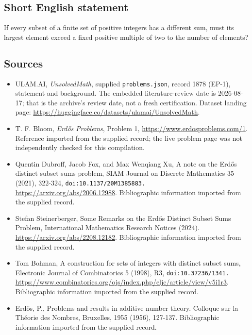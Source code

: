 \documentclass[11pt,a4paper]{article}
\begin{document}
\subsection{Short English statement}

If every subset of a finite set of positive integers has a different sum, must its largest element exceed a fixed positive multiple of two to the number of elements?

\subsection{Sources}

{\small

\begin{itemize}

\item[\hypertarget{source:1878:1}{S1}] ULAM.AI, \emph{UnsolvedMath}, supplied \texttt{problems.json}, record 1878 (EP-1), statement and background. The embedded literature-review date is 2026-08-17; that is the archive’s review date, not a fresh certification. Dataset landing page: \url{https://huggingface.co/datasets/ulamai/UnsolvedMath}.

\item[\hypertarget{source:1878:2}{S2}] T. F. Bloom, \emph{Erdős Problems}, Problem 1, \url{https://www.erdosproblems.com/1}. Reference imported from the supplied record; the live problem page was not independently checked for this compilation.

\item[\hypertarget{source:1878:3}{S3}] Quentin Dubroff, Jacob Fox, and Max Wenqiang Xu, A note on the Erdős distinct subset sums problem, SIAM Journal on Discrete Mathematics 35 (2021), 322-324, \nolinkurl{doi:10.1137/20M1385883.} \url{https://arxiv.org/abs/2006.12988}. Bibliographic information imported from the supplied record.

\item[\hypertarget{source:1878:4}{S4}] Stefan Steinerberger, Some Remarks on the Erdős Distinct Subset Sums Problem, International Mathematics Research Notices (2024). \url{https://arxiv.org/abs/2208.12182}. Bibliographic information imported from the supplied record.

\item[\hypertarget{source:1878:5}{S5}] Tom Bohman, A construction for sets of integers with distinct subset sums, Electronic Journal of Combinatorics 5 (1998), R3, \nolinkurl{doi:10.37236/1341.} \url{https://www.combinatorics.org/ojs/index.php/eljc/article/view/v5i1r3}. Bibliographic information imported from the supplied record.

\item[\hypertarget{source:1878:6}{S6}] Erd\H{o}s, P., Problems and results in additive number theory. Colloque sur la Th\'{e}orie des Nombres, Bruxelles, 1955 (1956), 127-137. Bibliographic information imported from the supplied record.

\end{itemize}

}

\label{end:1878}
\end{document}
